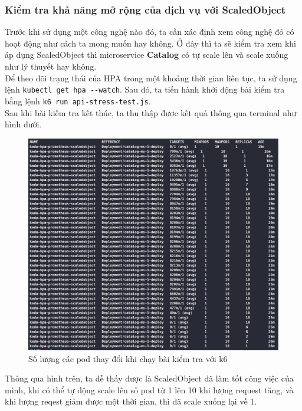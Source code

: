 \subsubsection{Kiểm tra khả năng mở rộng của dịch vụ với ScaledObject}
\noindent Trước khi sử dụng một công nghệ nào đó, ta cần xác định xem công nghệ đó có hoạt động như cách ta mong muốn hay không. Ở đây thì ta sẽ kiểm tra xem khi áp dụng ScaledObject thì microservice \textbf{Catalog} có tự scale lên và scale xuống như lý thuyết hay không.\\[0.5cm]
Để theo dõi trạng thái của HPA trong một khoảng thời gian liên tục, ta sử dụng lệnh \lstinline|kubectl get hpa --watch|. Sau đó, ta tiến hành khởi động bài kiểm tra bằng lệnh \lstinline|k6 run api-stress-test.js|.\\[0.5cm]
Sau khi bài kiếm tra kết thúc, ta thu thập được kết quả thông qua terminal như hình dưới.
\begin{figure}[H]
  \begin{center}
    \includegraphics[scale=0.55]{images/hanh/test-with-hpa-pod-scaling.png}
    \caption{Số lượng các pod thay đổi khi chạy bài kiểm tra với k6}
  \end{center}
  \label{}
\end{figure}
Thông qua hình trên, ta dễ thấy được là ScaledObject đã làm tốt công việc của mình, khi có thể tự động scale lên số pod từ 1 lên 10 khi lượng request tăng, và khi lượng reqest giảm được một thời gian, thì đã scale xuống lại về 1.

